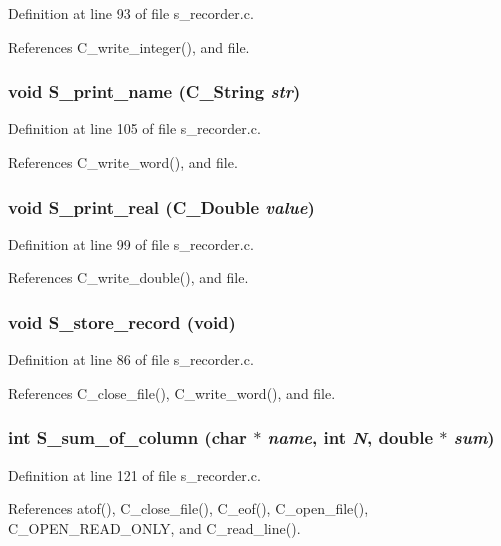 Definition at line 93 of file s\_\-recorder.c.

References C\_\-write\_\-integer(), and file.
\subsubsection{\setlength{\rightskip}{0pt plus 5cm}void S\_\-print\_\-name (\bf{C\_\-String} {\em str})}\label{s__recorder_8h_ea51083896ed8f95838e4af5905999ff}




Definition at line 105 of file s\_\-recorder.c.

References C\_\-write\_\-word(), and file.
\subsubsection{\setlength{\rightskip}{0pt plus 5cm}void S\_\-print\_\-real (\bf{C\_\-Double} {\em value})}\label{s__recorder_8h_a9425f58022c0f66db9ecf39058a82eb}




Definition at line 99 of file s\_\-recorder.c.

References C\_\-write\_\-double(), and file.
\subsubsection{\setlength{\rightskip}{0pt plus 5cm}void S\_\-store\_\-record (void)}\label{s__recorder_8h_2a43630b327230b1af12da50ac4c691b}




Definition at line 86 of file s\_\-recorder.c.

References C\_\-close\_\-file(), C\_\-write\_\-word(), and file.
\subsubsection{\setlength{\rightskip}{0pt plus 5cm}int S\_\-sum\_\-of\_\-column (char $\ast$ {\em name}, int {\em N}, double $\ast$ {\em sum})}\label{s__recorder_8h_4a73f9a37da2e92c5f115760cd4ee599}




Definition at line 121 of file s\_\-recorder.c.

References atof(), C\_\-close\_\-file(), C\_\-eof(), C\_\-open\_\-file(), C\_\-OPEN\_\-READ\_\-ONLY, and C\_\-read\_\-line().